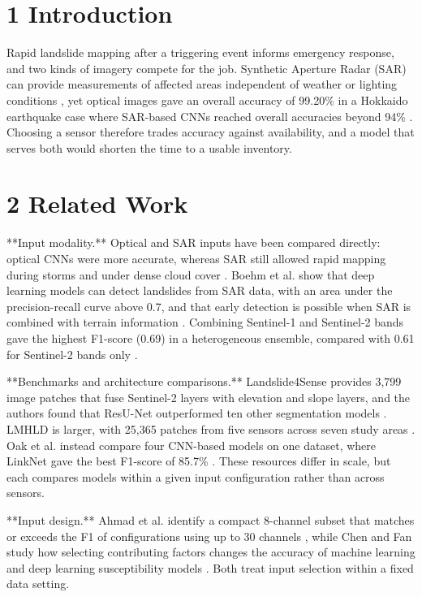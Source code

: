 \section{1 Introduction}

Rapid landslide mapping after a triggering event informs emergency response, and two kinds of imagery compete for the job. Synthetic Aperture Radar (SAR) can provide measurements of affected areas independent of weather or lighting conditions \cite{boehm2022}, yet optical images gave an overall accuracy of 99.20\% in a Hokkaido earthquake case where SAR-based CNNs reached overall accuracies beyond 94\% \cite{nava2021}. Choosing a sensor therefore trades accuracy against availability, and a model that serves both would shorten the time to a usable inventory.

\section{2 Related Work}

**Input modality.** Optical and SAR inputs have been compared directly: optical CNNs were more accurate, whereas SAR still allowed rapid mapping during storms and under dense cloud cover \cite{nava2021}. Boehm et al. show that deep learning models can detect landslides from SAR data, with an area under the precision-recall curve above 0.7, and that early detection is possible when SAR is combined with terrain information \cite{boehm2022}. Combining Sentinel-1 and Sentinel-2 bands gave the highest F1-score (0.69) in a heterogeneous ensemble, compared with 0.61 for Sentinel-2 bands only \cite{ganerd2023}.

**Benchmarks and architecture comparisons.** Landslide4Sense provides 3,799 image patches that fuse Sentinel-2 layers with elevation and slope layers, and the authors found that ResU-Net outperformed ten other segmentation models \cite{ghorbanzadeh2022}. LMHLD is larger, with 25,365 patches from five sensors across seven study areas \cite{liu2025}. Oak et al. instead compare four CNN-based models on one dataset, where LinkNet gave the best F1-score of 85.7\% \cite{oak2024}. These resources differ in scale, but each compares models within a given input configuration rather than across sensors.

**Input design.** Ahmad et al. identify a compact 8-channel subset that matches or exceeds the F1 of configurations using up to 30 channels \cite{ahmad2026}, while Chen and Fan study how selecting contributing factors changes the accuracy of machine learning and deep learning susceptibility models \cite{chen2023}. Both treat input selection within a fixed data setting.

